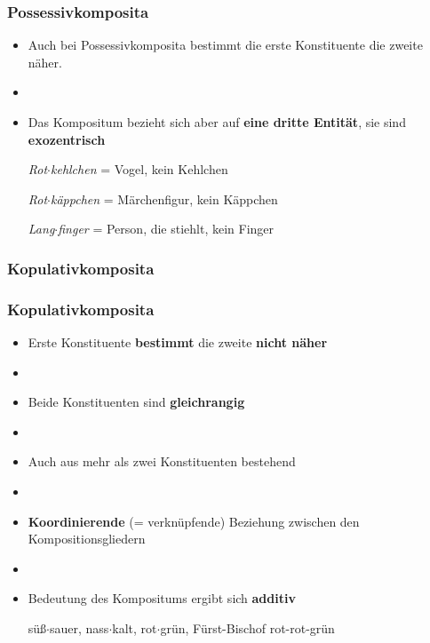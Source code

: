 \begin{frame}
\frametitle{Possessivkomposita}

\begin{itemize}
	\item Auch bei Possessivkomposita bestimmt die erste Konstituente die zweite näher.
	\item[]
	\item Das Kompositum bezieht sich aber auf \textbf{eine dritte Entität}, sie sind \textbf{exozentrisch}
	
	\ea \emph{Rot$\cdot$kehlchen} = Vogel, kein Kehlchen
	\z
	
	\ea \emph{Rot$\cdot$käppchen} = Märchenfigur, kein Käppchen
	\z
	
	\ea \emph{Lang$\cdot$finger} = Person, die stiehlt, kein Finger
	\z
	
\end{itemize}


\end{frame}


\subsubsection{Kopulativkomposita}


\begin{frame}
\frametitle{Kopulativkomposita}

\begin{itemize}
	\item Erste Konstituente \textbf{bestimmt} die zweite \textbf{nicht näher}
	\item[]
	\item Beide Konstituenten sind \textbf{gleichrangig}
	\item[]
	\item Auch aus mehr als zwei Konstituenten bestehend
	\item[]
	\item \textbf{Koordinierende} (= verknüpfende) Beziehung zwischen den Kompositionsgliedern
	\item[]
	\item Bedeutung des Kompositums ergibt sich \textbf{additiv}
	
	\eal 
	\ex süß$\cdot$sauer, nass$\cdot$kalt, rot$\cdot$grün, Fürst-Bischof
	\ex rot-rot-grün
	\zl
	
\end{itemize}


\end{frame}


